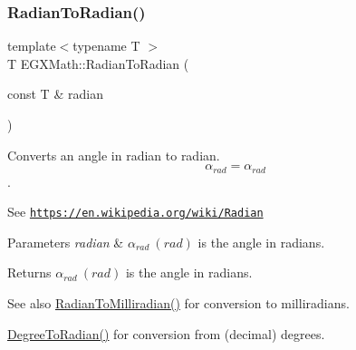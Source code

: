 \subsubsection{\texorpdfstring{Radian\+To\+Radian()}{RadianToRadian()}}
{\footnotesize\ttfamily template$<$typename T $>$ \\
T E\+G\+X\+Math\+::\+Radian\+To\+Radian (\begin{DoxyParamCaption}\item[{const T \&}]{radian }\end{DoxyParamCaption})}



Converts an angle in radian to radian. \[\alpha_{rad}=\alpha_{rad}\]. 

See \href{https://en.wikipedia.org/wiki/Radian}{\tt https\+://en.\+wikipedia.\+org/wiki/\+Radian} 
\begin{DoxyParams}{Parameters}
{\em radian} & $\alpha_{rad}\ (rad)$ is the angle in radians. \\
\hline
\end{DoxyParams}
\begin{DoxyReturn}{Returns}
$\alpha_{rad}\ (rad)$ is the angle in radians. 
\end{DoxyReturn}
\begin{DoxySeeAlso}{See also}
\mbox{\hyperlink{group___e_g_x_math-_angle_conversions-_radian_gaea391f0cca39b05e298dd1cae162e7f1}{Radian\+To\+Milliradian()}} for conversion to milliradians. 

\mbox{\hyperlink{group___e_g_x_math-_angle_conversions-_degree_ga48585541b228c852c9d08a9eac3682f0}{Degree\+To\+Radian()}} for conversion from (decimal) degrees. 
\end{DoxySeeAlso}
